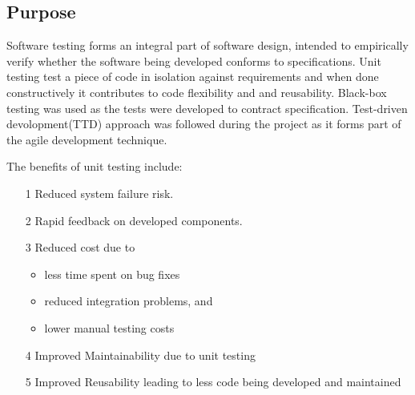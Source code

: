 \subsection{Purpose}	

Software testing forms an integral part of software design, intended to empirically verify whether the software being developed conforms to specifications. Unit testing test a piece of code in isolation against requirements and when done constructively it contributes to code flexibility and and reusability. Black-box testing was used as the tests were developed to contract specification. Test-driven devolopment(TTD) approach was followed during the project as it forms part of the agile development technique.

The benefits of unit testing include:
\begin{enumerate}
	\item[1]Reduced system failure risk.
	
	\item[2]Rapid feedback on developed components.
	
	\item[3]Reduced cost due to
	\begin{itemize}
		\item less time spent on bug fixes
		\item reduced integration problems, and 
		\item lower manual testing costs
	\end{itemize}
	
	\item[4]Improved Maintainability due to unit testing
	
	\item[5]Improved Reusability leading to less code being developed and maintained
\end{enumerate}